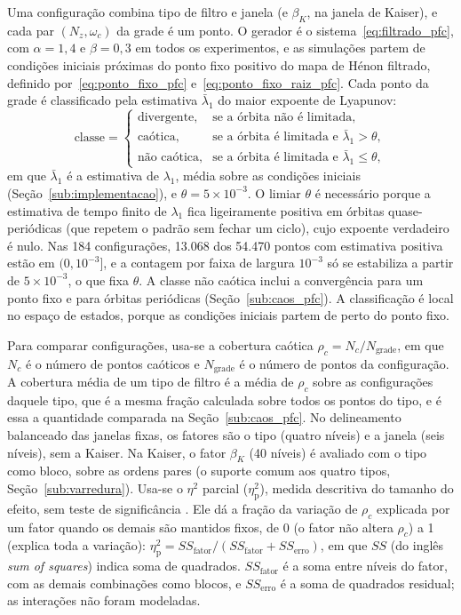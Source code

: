 \documentclass{pfccefsa}
\begin{document}
Uma configuração combina tipo de filtro e janela (e $\beta_K$, na janela de
Kaiser), e cada par $(N_z,\omega_c)$ da grade é um ponto. O gerador é o
sistema~\eqref{eq:filtrado_pfc}, com $\alpha=1{,}4$ e $\beta=0{,}3$ em todos os
experimentos, e as simulações partem de condições iniciais próximas do ponto fixo
positivo do mapa de Hénon filtrado, definido por~\eqref{eq:ponto_fixo_pfc}
e~\eqref{eq:ponto_fixo_raiz_pfc}. Cada ponto da
grade é classificado pela estimativa $\bar\lambda_1$ do maior expoente de
Lyapunov:
\begin{equation}
  \text{classe}=
  \begin{cases}
    \text{divergente}, & \text{se a órbita não é limitada},\\
    \text{caótica},    & \text{se a órbita é limitada e } \bar\lambda_1>\theta,\\
    \text{não caótica}, & \text{se a órbita é limitada e } \mbox{$\bar\lambda_1\le\theta$},
  \end{cases}
  \label{eq:criterio_pfc}
\end{equation}
em que $\bar\lambda_1$ é a estimativa de $\lambda_1$, média sobre as condições
iniciais (Seção~\ref{sub:implementacao}), e $\theta=5\times10^{-3}$. O limiar
$\theta$ é necessário porque a estimativa de tempo finito de $\lambda_1$ fica ligeiramente positiva em órbitas
quase-periódicas (que repetem o padrão sem fechar um ciclo), cujo expoente
verdadeiro é nulo. Nas 184 configurações, 13.068
dos 54.470 pontos com estimativa positiva estão em $(0,10^{-3}]$, e a contagem
por faixa de largura $10^{-3}$ só se estabiliza a partir de $5\times10^{-3}$, o
que fixa $\theta$. A classe não caótica inclui a
convergência para um ponto fixo e para órbitas periódicas
(Seção~\ref{sub:caos_pfc}). A classificação é
local no espaço de estados, porque as condições iniciais partem de perto do
ponto fixo.

Para comparar configurações, usa-se a cobertura caótica
$\rho_c=N_c/N_{\text{grade}}$, em que $N_c$ é o número de pontos caóticos e
$N_{\text{grade}}$ é o número de pontos da configuração. A cobertura média de um
tipo de filtro é a média de $\rho_c$ sobre as configurações daquele tipo, que é
a mesma fração calculada sobre todos os pontos do tipo, e é essa a quantidade
comparada na Seção~\ref{sub:caos_pfc}. No delineamento balanceado das janelas fixas,
os fatores são o tipo (quatro níveis) e a janela (seis níveis), sem a Kaiser.
Na Kaiser, o fator $\beta_K$ (40 níveis) é avaliado com o tipo como bloco, sobre
as ordens pares (o suporte comum aos quatro tipos, Seção~\ref{sub:varredura}). Usa-se o $\eta^2$ parcial ($\eta^2_{\mathrm{p}}$), medida descritiva do tamanho
do efeito, sem teste de significância \cite{Richardson2011}. Ele dá a fração da variação de $\rho_c$
explicada por um fator quando os demais são mantidos fixos, de 0 (o fator não
altera $\rho_c$) a 1 (explica toda a variação):
$\eta^2_{\mathrm{p}}=SS_{\text{fator}}/(SS_{\text{fator}}+SS_{\text{erro}})$,
em que $SS$ (do inglês \textit{sum of squares}) indica soma de quadrados.
$SS_{\text{fator}}$ é a soma entre níveis do fator, com as
demais combinações como blocos, e $SS_{\text{erro}}$ é a soma de quadrados
residual; as interações não foram modeladas.
\end{document}
